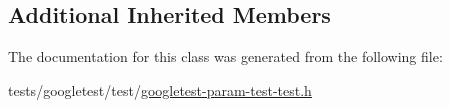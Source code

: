 \subsection*{Additional Inherited Members}


The documentation for this class was generated from the following file\+:\begin{DoxyCompactItemize}
\item 
tests/googletest/test/\hyperlink{googletest-param-test-test_8h}{googletest-\/param-\/test-\/test.\+h}\end{DoxyCompactItemize}
